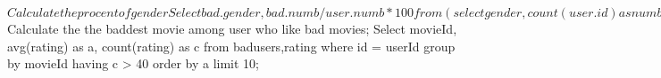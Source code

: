 \begin{spverbatim}
$Calculate the procent of gender
Select bad.gender, bad.numb/user.numb*100 from 
	(select gender,count(user.id) as numb from badusers, user where user.id = badusers.id group by gender) as bad,
	(select gender,count(user.id) as numb from user group by gender) as user
	where user.gender = bad.gender;

$Calculate the the baddest movie among user who like bad movies;
Select movieId, avg(rating) as a, count(rating) as c from badusers,rating
	where id = userId
	group by movieId
	having c > 40
	order by a
	limit 10;
\end{spverbatim}
\newpage
